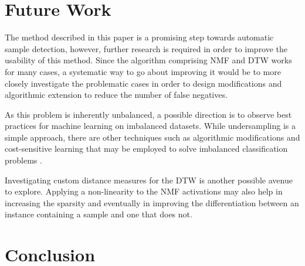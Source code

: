 \documentclass{article}
\begin{document}

\section{Future Work}

The method described in this paper is a promising step towards automatic sample detection, however, further research is required in order to improve the usability of this method. Since the algorithm comprising NMF and DTW works for many cases, a systematic way to go about improving it would be to more closely investigate the problematic cases in order to design modifications and algorithmic extension to reduce the number of false negatives.

As this problem is inherently unbalanced, a possible direction is to observe best practices for machine learning on imbalanced datasets. While undersampling is a simple approach, there are other techniques such as algorithmic modifications and cost-sensitive learning that may be employed to solve imbalanced classification problems \cite{lopez2013insight}.

Investigating custom distance measures for the DTW is another possible avenue to explore. Applying a non-linearity to the NMF activations may also help in increasing the sparsity and eventually in improving the differentiation between an instance containing a sample and one that does not.

\section{Conclusion}

\end{document}
